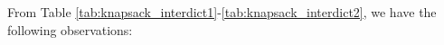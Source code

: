 \documentclass[11pt]{article}
\begin{document}
From Table \ref{tab:knapsack_interdict1}-\ref{tab:knapsack_interdict2}, we have the following observations:
\end{document}
